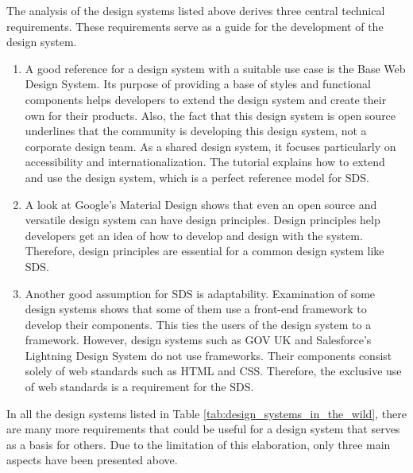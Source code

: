 The analysis of the design systems listed above derives three central technical requirements. These requirements serve as a guide for the development of the design system.
\begin{enumerate}
    \item A good reference for a design system with a suitable use case is the Base Web Design System. Its purpose of providing a base of styles and functional components helps developers to extend the design system and create their own for their products. Also, the fact that this design system is open source underlines that the community is developing this design system, not a corporate design team. As a shared design system, it focuses particularly on accessibility and internationalization. The tutorial explains how to extend and use the design system, which is a perfect reference model for \ac{SDS}. 
    \item A look at Google's Material Design shows that even an open source and versatile design system can have design principles. Design principles help developers get an idea of how to develop and design with the system. Therefore, design principles are essential for a common design system like SDS.
    \item Another good assumption for \ac{SDS} is adaptability. Examination of some design systems shows that some of them use a front-end framework to develop their components. This ties the users of the design system to a framework. However, design systems such as GOV UK and Salesforce's Lightning Design System do not use frameworks. Their components consist solely of web standards such as \ac{HTML} and \ac{CSS}. Therefore, the exclusive use of web standards is a requirement for the \ac{SDS}.
\end{enumerate}

In all the design systems listed in Table \ref{tab:design_systems_in_the_wild}, there are many more requirements that could be useful for a design system that serves as a basis for others. Due to the limitation of this elaboration, only three main aspects have been presented above.\\




